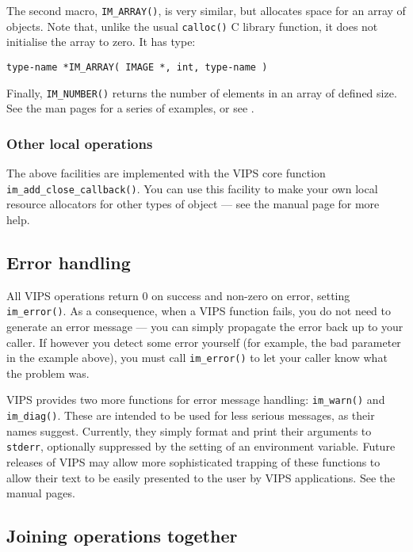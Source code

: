 The second macro, \verb+IM_ARRAY()+, is very similar, but allocates
space for an array of objects. Note that, unlike the usual \verb+calloc()+
C library function, it does not initialise the array to zero. It has type:

\begin{verbatim}
type-name *IM_ARRAY( IMAGE *, int, type-name )
\end{verbatim}

Finally, \verb+IM_NUMBER()+ returns the number of elements in an array of
defined size.  See the man pages for a series of examples, or
see .

\subsubsection{Other local operations}

The above facilities are implemented with the VIPS core function
\verb+im_add_close_callback()+. You can use this facility to make your own
local resource allocators for other types of object --- see the manual page
for more help.

\subsection{Error handling}

All VIPS operations return 0 on success and non-zero on error, setting
\verb+im_error()+. As a consequence, when a VIPS function fails, you do not
need to generate an error message --- you can simply propagate the error back
up to your caller. If however you detect some error yourself (for example,
the bad parameter in the example above), you must call \verb+im_error()+
to let your caller know what the problem was.

VIPS provides two more functions for error message handling: \verb+im_warn()+
and \verb+im_diag()+. These are intended to be used for less serious
messages, as their names suggest. Currently, they simply format and print
their arguments to \verb+stderr+, optionally suppressed by the setting of an
environment variable. Future releases of VIPS may allow more sophisticated
trapping of these functions to allow their text to be easily presented to
the user by VIPS applications. See the manual pages.

\subsection{Joining operations together}
\label{sec:joinup}

